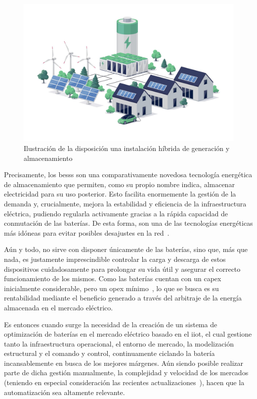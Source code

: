\begin{figure}
  \centering
  \includegraphics[width=0.5\linewidth]{figures/instalacion-bess.jpg}
  \caption{Ilustración de la disposición una instalación híbrida de generación y almacenamiento\cite{deutz2023what}}
  \label{fig:instalacion-bess}
\end{figure}

Precisamente, los \glspl{bess} son una comparativamente novedosa tecnología energética de almacenamiento que permiten, como su propio nombre indica, almacenar electricidad para su uso posterior. Esto facilita enormemente la gestión de la demanda y, crucialmente, mejora la estabilidad y eficiencia de la infraestructura eléctrica, pudiendo regularla activamente gracias a la rápida capacidad de conmutación de las baterías. De esta forma, son una de las tecnologías energéticas más idóneas para evitar posibles desajustes en la red~\cite{xu2014bess}.

Aún y todo, no sirve con disponer únicamente de las baterías, sino que, más que nada, es justamente imprescindible controlar la carga y descarga de estos dispositivos cuidadosamente para prolongar su vida útil y asegurar el correcto funcionamiento de los mismos. Como las baterías cuentan con un \gls{capex} inicialmente considerable, pero un \gls{opex} mínimo~\cite{larsson2018cost}, lo que se busca es su rentabilidad mediante el beneficio generado a través del arbitraje de la energía almacenada en el mercado eléctrico.

Es entonces cuando surge la necesidad de la creación de un sistema de optimización de baterías en el mercado eléctrico basado en el \gls{iiot}, el cual gestione tanto la infraestructura operacional, el entorno de mercado, la modelización estructural y el comando y control, continuamente ciclando la batería incansablemente en busca de los mejores márgenes. Aún siendo posible realizar parte de dicha gestión manualmente, la complejidad y velocidad de los mercados (teniendo en especial consideración las recientes actualizaciones~\cite{omie2025instruccion}), hacen que la automatización sea altamente relevante.

